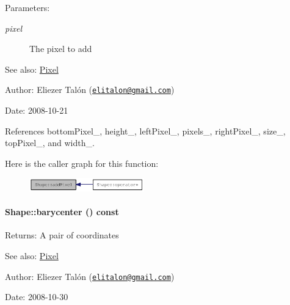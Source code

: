 \begin{Desc}
\item[Parameters:]
\begin{description}
\item[{\em pixel}]The pixel to add\end{description}
\end{Desc}
\begin{Desc}
\item[See also:]\hyperlink{_shape_8hpp_535e59456e3e633842529cfa8ea103c4}{Pixel}\end{Desc}
\begin{Desc}
\item[Author:]Eliezer Talón (\href{mailto:elitalon@gmail.com}{\tt elitalon@gmail.com}) \end{Desc}
\begin{Desc}
\item[Date:]2008-10-21 \end{Desc}


References bottomPixel\_\-, height\_\-, leftPixel\_\-, pixels\_\-, rightPixel\_\-, size\_\-, topPixel\_\-, and width\_\-.

Here is the caller graph for this function:\nopagebreak
\begin{figure}[H]
\begin{center}
\leavevmode
\includegraphics[width=141pt]{class_shape_f6114234203d9473f1fef9e6391f9243_icgraph}
\end{center}
\end{figure}
\hypertarget{class_shape_a935b8870ea61569990b304b77513923}{
\paragraph[{barycenter}]{ Shape::barycenter () const}\hfill}
\label{class_shape_a935b8870ea61569990b304b77513923}


\begin{Desc}
\item[Returns:]A pair of coordinates\end{Desc}
\begin{Desc}
\item[See also:]\hyperlink{_shape_8hpp_535e59456e3e633842529cfa8ea103c4}{Pixel}\end{Desc}
\begin{Desc}
\item[Author:]Eliezer Talón (\href{mailto:elitalon@gmail.com}{\tt elitalon@gmail.com}) \end{Desc}
\begin{Desc}
\item[Date:]2008-10-30 \end{Desc}


